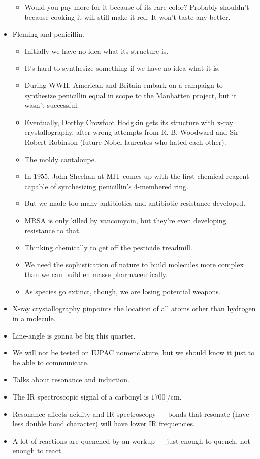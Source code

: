 \documentclass[../notes.tex]{subfiles}
\begin{document}
\begin{itemize}
    \begin{itemize}
        \item Would you pay more for it because of its rare color? Probably shouldn't because cooking it will still make it red. It won't taste any better.
    \end{itemize}
    \item Fleming and penicillin.
    \begin{itemize}
        \item Initially we have no idea what its structure is.
        \item It's hard to synthesize something if we have no idea what it is.
        \item During WWII, American and Britain embark on a campaign to synthesize penicillin equal in scope to the Manhatten project, but it wasn't successful.
        \item Eventually, Dorthy Crowfoot Hodgkin gets its structure with x-ray crystallography, after wrong attempts from R. B. Woodward and Sir Robert Robinson (future Nobel laureates who hated each other).
        \item The moldy cantaloupe.
        \item In 1955, John Sheehan at MIT comes up with the first chemical reagent capable of synthesizing penicillin's 4-membered ring.
        \item But we made too many antibiotics and antibiotic resistance developed.
        \item MRSA is only killed by vancomycin, but they're even developing resistance to that.
        \item Thinking chemically to get off the pesticide treadmill.
        \item We need the sophistication of nature to build molecules more complex than we can build en masse pharmaceutically.
        \item As species go extinct, though, we are losing potential weapons.
    \end{itemize}
    \item X-ray crystallography pinpoints the location of all atoms other than hydrogen in a molecule.
    \item Line-angle is gonna be big this quarter.
    \item We will not be tested on IUPAC nomenclature, but we should know it just to be able to communicate.
    \item Talks about resonance and induction.
    \item The IR spectroscopic signal of a carbonyl is $\SI{1700}{\per\centi\meter}$.
    \item Resonance affects acidity and IR spectroscopy --- bonds that resonate (have less double bond character) will have lower IR frequencies.
    \item A lot of reactions are quenched by an  workup --- just enough to quench, not enough to react.
\end{itemize}
\end{document}
